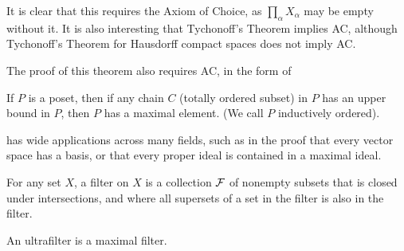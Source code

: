 It is clear that this requires the Axiom of Choice, as $\prod_\alpha X_\alpha$ may be empty without it. It is also interesting that Tychonoff's Theorem implies AC, although Tychonoff's Theorem for Hausdorff compact spaces does not imply AC.

The proof of this theorem also requires AC, in the form of 

\begin{theorem}
    \label{thm:zorn}
    If $P$ is a poset, then if any chain $C$ (totally ordered subset) in $P$ has an upper bound in $P$, then $P$ has a maximal element. (We call $P$ inductively ordered).
\end{theorem}

 has wide applications across many fields, such as in the proof that every vector space has a basis, or that every proper ideal is contained in a maximal ideal.

\begin{definition}
    For any set $X$, a filter on $X$ is a collection $\mathcal F$ of nonempty subsets that is closed under intersections, and where all supersets of a set in the filter is also in the filter.

    An ultrafilter is a maximal filter.
\end{definition}

